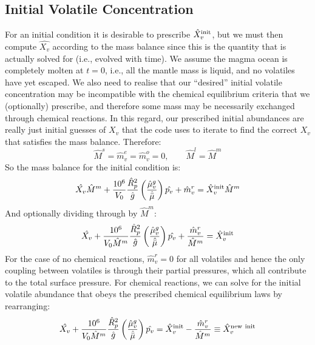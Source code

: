 \subsection{Initial Volatile Concentration}
For an initial condition it is desirable to prescribe $\hat{X}_v^{\rm init}$, but we must then compute $\hat{X_v}$ according to the mass balance since this is the quantity that is actually solved for (i.e., evolved with time).  We assume the magma ocean is completely molten at $t=0$, i.e., all the mantle mass is liquid, and no volatiles have yet escaped.  We also need to realise that our ``desired'' initial volatile concentration may be incompatible with the chemical equilibrium criteria that we (optionally) prescribe, and therefore some mass may be necessarily exchanged through chemical reactions.  In this regard, our prescribed initial abundances are really just initial guesses of $X_v$ that the code uses to iterate to find the correct $X_v$ that satisfies the mass balance.  Therefore:
\begin{equation}
\hat{M}^s = \hat{m}_v^e = \hat{m}_v^o = 0, \qquad \hat{M}^l = \hat{M}^m
\end{equation}
So the mass balance for the initial condition is:
\begin{equation}
\hat{X_v} \hat{M}^m + \frac{10^6}{V_0} \frac{\hat{R}_p^2}{\hat{g}} \left( \frac{\hat{\mu}_v^g}{\hat{\bar{\mu}}} \right)\hat{p_v} + \hat{m}_v^r = \hat{X}_v^{\rm init} \hat{M}^m
\label{eq:volinit}
\end{equation}
And optionally dividing through by $\hat{M}^m$:
\begin{equation}
\hat{X_v} + \frac{10^6}{V_0 \hat{M}^m} \frac{\hat{R}_p^2}{\hat{g}} \left( \frac{\hat{\mu}_v^g}{\hat{\bar{\mu}}} \right)\hat{p_v} + \frac{\hat{m}_v^r}{\hat{M}^m} = \hat{X}_v^{\rm init}
\label{eq:volinit2}
\end{equation}
For the case of no chemical reactions, $\hat{m}_v^r=0$ for all volatiles and hence the only coupling between volatiles is through their partial pressures, which all contribute to the total surface pressure.  For chemical reactions, we can solve for the initial volatile abundance that obeys the prescribed chemical equilibrium laws by rearranging:
\begin{equation}
\hat{X_v} + \frac{10^6}{V_0 \hat{M}^m} \frac{\hat{R}_p^2}{\hat{g}} \left( \frac{\hat{\mu}_v^g}{\hat{\bar{\mu}}} \right)\hat{p_v} = \hat{X}_v^{\rm init} - \frac{\hat{m}_v^r}{\hat{M}^m} \equiv \hat{X}_v^{\rm new\ init} 
\label{eq:volinit3}
\end{equation}

